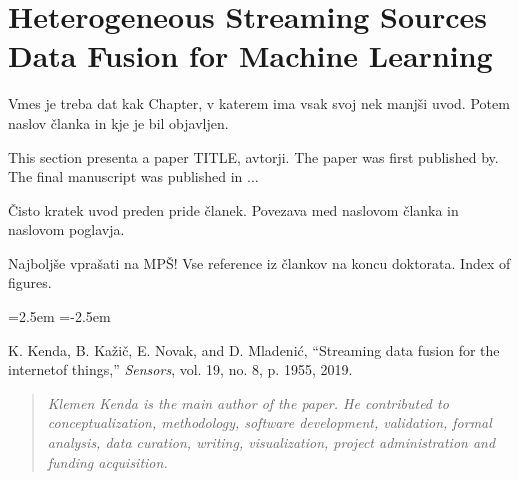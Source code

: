 % 
\chapter{Heterogeneous Streaming Sources Data Fusion for Machine Learning}
\label{ch:data-fusion}



Vmes je treba dat kak Chapter, v katerem ima vsak svoj nek manjši uvod. 
Potem naslov članka in kje je bil objavljen. 

This section presenta a paper TITLE, avtorji. The paper was first published by. The final manuscript was published in ... 

Čisto kratek uvod preden pride članek. Povezava med naslovom članka in naslovom poglavja.


Najboljše vprašati na MPŠ!
Vse reference iz člankov na koncu doktorata.
Index of figures.

\begin{list}{}
{\leftmargin=2.5em \itemindent=-2.5em}
    \item K. Kenda, B. Kažič, E. Novak, and D. Mladenić, “Streaming data fusion for the internetof things,” \textit{Sensors}, vol. 19, no. 8, p. 1955, 2019.
\end{list}

\begin{quote}
    \textit{Klemen Kenda is the main author of the paper. He contributed to conceptualization, methodology, software development, validation, formal analysis, data curation, writing, visualization, project administration and funding acquisition.}
\end{quote}

